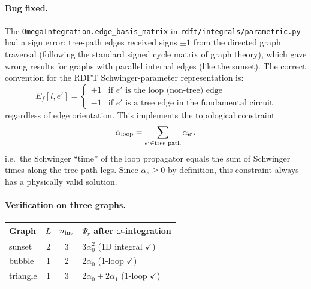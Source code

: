 \documentclass[11pt,a4paper]{article}
\theoremstyle{plain}
\begin{document}
\paragraph{Bug fixed.}
The \texttt{OmegaIntegration.edge\_basis\_matrix} in
\texttt{rdft/integrals/parametric.py} had a sign error: tree-path edges
received signs $\pm 1$ from the directed graph traversal (following the
standard signed cycle matrix of graph theory), which gave wrong results
for graphs with parallel internal edges (like the sunset).  The correct
convention for the RDFT Schwinger-parameter representation is:
\[
  E_f[l, e'] =
  \begin{cases}
    +1 & \text{if } e' \text{ is the loop (non-tree) edge}\\
    -1 & \text{if } e' \text{ is a tree edge in the fundamental circuit}
  \end{cases}
\]
regardless of edge orientation.  This implements the topological constraint
\[
  \alpha_{\rm loop} = \sum_{e' \in \text{tree path}} \alpha_{e'},
\]
i.e.\ the Schwinger ``time'' of the loop propagator equals the sum of
Schwinger times along the tree-path legs.  Since $\alpha_e \geq 0$ by
definition, this constraint always has a physically valid solution.

\paragraph{Verification on three graphs.}
\begin{center}
\begin{tabular}{lccl}
\toprule
Graph & $L$ & $n_{\rm int}$ & $\Psi_r$ after $\omega$-integration \\
\midrule
sunset   & 2 & 3 & $3\alpha_0^2$ \quad (1D integral $\checkmark$) \\
bubble   & 1 & 2 & $2\alpha_0$ \quad (1-loop $\checkmark$) \\
triangle & 1 & 3 & $2\alpha_0 + 2\alpha_1$ \quad (1-loop $\checkmark$) \\
\bottomrule
\end{tabular}
\end{center}
\end{document}
